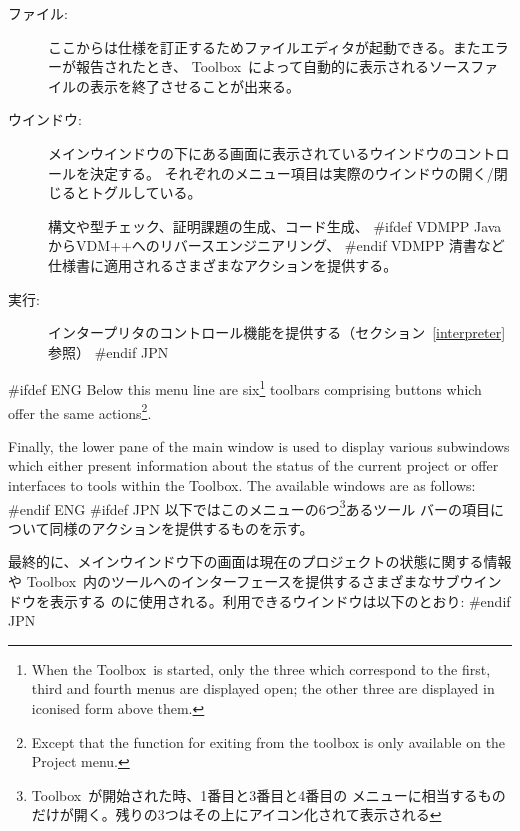 \documentclass[\pformat,12pt]{article}
\newcommand{\Toolbox}{Toolbox}
\newcommand{\Toolbox}{Toolbox}
\newcommand{\guicmd}[1]{{\sf #1}}
\newcommand{\guicmd}[1]{{\gt #1}}
\begin{document}
\begin{description}
\item[\guicmd{ファイル}:]
  ここからは仕様を訂正するためファイルエディタが起動できる。またエラーが報告されたとき、
  \Toolbox\ によって自動的に表示されるソースファイルの表示を終了させることが出来る。

\item[\guicmd{ウインドウ}:]
  メインウインドウの下にある画面に表示されているウインドウのコントロールを決定する。
  それぞれのメニュー項目は実際のウインドウの開く/閉じるとトグルしている。

  構文や型チェック、証明課題の生成、コード生成、
#ifdef VDMPP 
JavaからVDM++へのリバースエンジニアリング、
#endif VDMPP 
  清書など仕様書に適用されるさまざまなアクションを提供する。

\item[\guicmd{実行}:]
  インタープリタのコントロール機能を提供する（セクション~\ref{interpreter}参照）
#endif JPN
\end{description}

#ifdef ENG
  Below this menu line are six\footnote{When the \Toolbox\ is started,
  only the three which correspond to the first, third and fourth menus are
  displayed open; the other three are displayed in iconised form above
  them.} toolbars comprising buttons which offer the same
  actions\footnote{Except that the function for exiting from the toolbox
  is only available on the \guicmd{Project} menu.}.
  
  Finally, the lower pane of the main window is used to display various
  subwindows which either present information about the status of the
  current project or offer interfaces to tools within the \Toolbox. The
  available windows are as follows:
#endif ENG
#ifdef JPN
  以下ではこのメニューの6つ\footnote{\Toolbox\ が開始された時、1番目と3番目と4番目の
  メニューに相当するものだけが開く。残りの3つはその上にアイコン化されて表示される}あるツール
  バーの項目について同様のアクションを提供するものを示す。
  
  最終的に、メインウインドウ下の画面は現在のプロジェクトの状態に関する情報や
  \Toolbox\ 内のツールへのインターフェースを提供するさまざまなサブウインドウを表示する
  のに使用される。利用できるウインドウは以下のとおり:
#endif JPN
\end{document}
